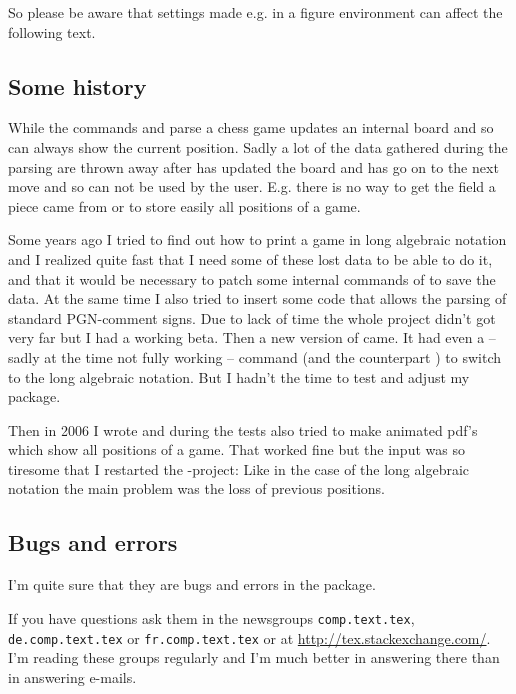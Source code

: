 \documentclass[pagesize,parskip=half-,fontsize=12pt]{scrartcl}
\begin{document}
So please be aware that settings made e.g. in a figure environment
can affect the following text.


\subsection{Some history}

While the commands  and  parse a chess
game \skaksty updates an internal board and so can always show the
current position. Sadly a lot of the data gathered during the
parsing are thrown away after  has updated the
board and  has go on to the next move and so can not be used by the
user. E.g. there is no way to get the field a piece came from or to
store easily all positions of a game.

Some years ago I tried to find out how to print a game in long
algebraic notation and I realized quite fast that I need some of
these lost data to be able to do it, and that it would be necessary
to patch some internal commands of \skaksty to save the data. At the
same time I also tried to insert some code that allows the parsing of
standard PGN-comment signs. Due to lack of time the whole project
didn't got very far but I had a working beta. Then a new version of
\skaksty came. It had even a -- sadly at the time not fully working -- command %
(and the counterpart ) to switch to the long algebraic
notation. But I hadn't the time to test and adjust my package.


Then in 2006 I wrote \pchessboard and during the tests also tried to
make animated pdf's which show all positions of a game. That worked
fine but the input was so tiresome that I restarted the
-project: Like in the case of the long algebraic
notation the main problem was the loss of previous positions.


\subsection{Bugs and errors}

I'm quite sure that they are bugs and errors in the package.

If you have questions ask them in the newsgroups
\nolinkurl{comp.text.tex}, \nolinkurl{de.comp.text.tex} or
\nolinkurl{fr.comp.text.tex} or at \url{http://tex.stackexchange.com/}. I'm reading these groups regularly and
I'm much better in answering there than in answering e-mails.
\end{document}
